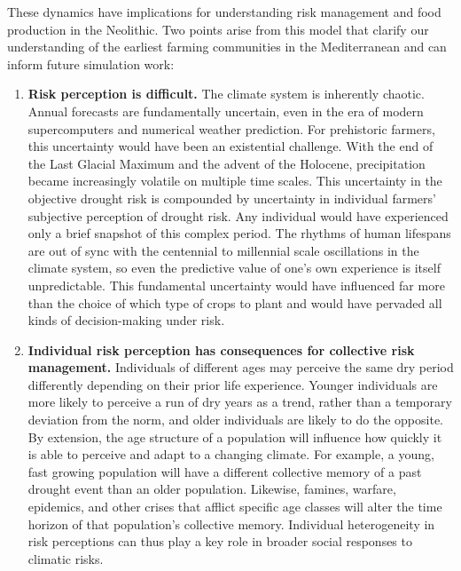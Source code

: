 \documentclass[smallextended]{svjour3}       %
\begin{document}
These dynamics have implications for understanding risk management and food production in the Neolithic. Two points arise from this model that clarify our understanding of the earliest farming communities in the Mediterranean and can inform future simulation work:

\begin{enumerate}
\def\labelenumi{\arabic{enumi}.}
\item
  \textbf{Risk perception is difficult.} The climate system is inherently chaotic. Annual forecasts are fundamentally uncertain, even in the era of modern supercomputers and numerical weather prediction. For prehistoric farmers, this uncertainty would have been an existential challenge. With the end of the Last Glacial Maximum and the advent of the Holocene, precipitation became increasingly volatile on multiple time scales. This uncertainty in the objective drought risk is compounded by uncertainty in individual farmers' subjective perception of drought risk. Any individual would have experienced only a brief snapshot of this complex period. The rhythms of human lifespans are out of sync with the centennial to millennial scale oscillations in the climate system, so even the predictive value of one's own experience is itself unpredictable. This fundamental uncertainty would have influenced far more than the choice of which type of crops to plant and would have pervaded all kinds of decision-making under risk.
\item
  \textbf{Individual risk perception has consequences for collective risk management.} Individuals of different ages may perceive the same dry period differently depending on their prior life experience. Younger individuals are more likely to perceive a run of dry years as a trend, rather than a temporary deviation from the norm, and older individuals are likely to do the opposite. By extension, the age structure of a population will influence how quickly it is able to perceive and adapt to a changing climate. For example, a young, fast growing population will have a different collective memory of a past drought event than an older population. Likewise, famines, warfare, epidemics, and other crises that afflict specific age classes will alter the time horizon of that population's collective memory. Individual heterogeneity in risk perceptions can thus play a key role in broader social responses to climatic risks.
\end{enumerate}
\end{document}
